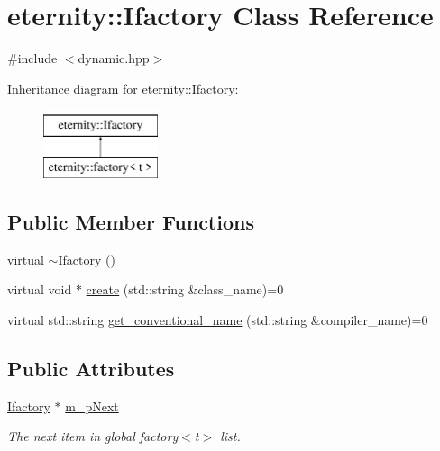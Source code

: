 \hypertarget{classeternity_1_1_ifactory}{}\section{eternity\+:\+:Ifactory Class Reference}
\label{classeternity_1_1_ifactory}


{\ttfamily \#include $<$dynamic.\+hpp$>$}

Inheritance diagram for eternity\+:\+:Ifactory\+:\begin{figure}[H]
\begin{center}
\leavevmode
\includegraphics[height=2.000000cm]{classeternity_1_1_ifactory}
\end{center}
\end{figure}
\subsection*{Public Member Functions}
\begin{DoxyCompactItemize}
\item 
virtual \hyperlink{classeternity_1_1_ifactory_a5bcc4b3255bd1030562e0e554ece0a05}{$\sim$\+Ifactory} ()
\item 
virtual void $\ast$ \hyperlink{classeternity_1_1_ifactory_afaca5a9abf52fa3a731c3dfed7cb73b3}{create} (std\+::string \&class\+\_\+name)=0
\item 
virtual std\+::string \hyperlink{classeternity_1_1_ifactory_a6c2afa73d61aaa81233ab1216c508252}{get\+\_\+conventional\+\_\+name} (std\+::string \&compiler\+\_\+name)=0
\end{DoxyCompactItemize}
\subsection*{Public Attributes}
\begin{DoxyCompactItemize}
\item 
\hyperlink{classeternity_1_1_ifactory}{Ifactory} $\ast$ \hyperlink{classeternity_1_1_ifactory_a6749c6d3f8aea62a3084c0825f0687c5}{m\+\_\+p\+Next}
\begin{DoxyCompactList}\small\item\em The next item in global factory$<$t$>$ list. \end{DoxyCompactList}\end{DoxyCompactItemize}
